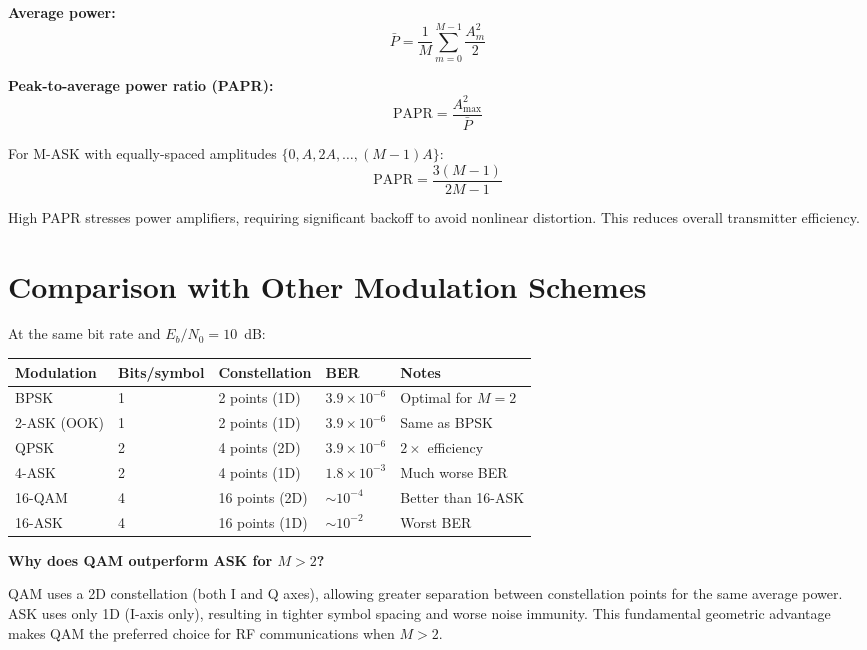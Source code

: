 \textbf{Average power:}
\begin{equation}
\bar{P} = \frac{1}{M} \sum_{m=0}^{M-1} \frac{A_m^2}{2}
\end{equation}

\textbf{Peak-to-average power ratio (PAPR):}
\begin{equation}
\mathrm{PAPR} = \frac{A_{\max}^2}{\bar{P}}
\end{equation}

For M-ASK with equally-spaced amplitudes $\{0, A, 2A, \ldots, (M-1)A\}$:
\begin{equation}
\mathrm{PAPR} = \frac{3(M-1)}{2M-1}
\end{equation}

\begin{warningbox}
High PAPR stresses power amplifiers, requiring significant backoff to avoid nonlinear distortion. This reduces overall transmitter efficiency.
\end{warningbox}

\section{Comparison with Other Modulation Schemes}

At the same bit rate and $E_b/N_0 = 10$~dB:

\begin{center}
\begin{tabularx}{\textwidth}{@{}llXlX@{}}
\toprule
Modulation & Bits/symbol & Constellation & BER & Notes \\
\midrule
BPSK & 1 & 2 points (1D) & $3.9 \times 10^{-6}$ & Optimal for $M=2$ \\
2-ASK (OOK) & 1 & 2 points (1D) & $3.9 \times 10^{-6}$ & Same as BPSK \\
QPSK & 2 & 4 points (2D) & $3.9 \times 10^{-6}$ & $2\times$ efficiency \\
4-ASK & 2 & 4 points (1D) & $1.8 \times 10^{-3}$ & Much worse BER \\
16-QAM & 4 & 16 points (2D) & $\sim 10^{-4}$ & Better than 16-ASK \\
16-ASK & 4 & 16 points (1D) & $\sim 10^{-2}$ & Worst BER \\
\bottomrule
\end{tabularx}
\end{center}

\begin{keyconcept}
\textbf{Why does QAM outperform ASK for $M > 2$?}

QAM uses a 2D constellation (both I and Q axes), allowing greater separation between constellation points for the same average power. ASK uses only 1D (I-axis only), resulting in tighter symbol spacing and worse noise immunity. This fundamental geometric advantage makes QAM the preferred choice for RF communications when $M > 2$.
\end{keyconcept}

